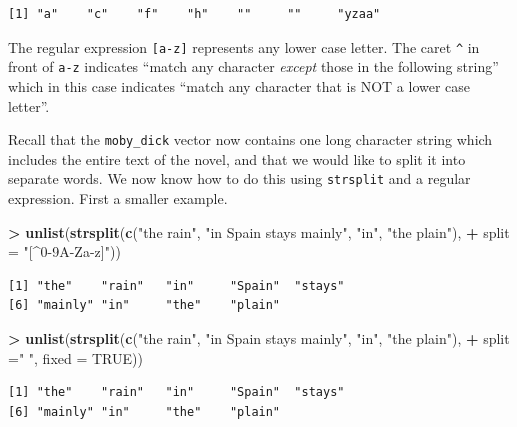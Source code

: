 \documentclass[
]{krantz}
\makeatletter
\newenvironment{Shaded}{\begin{snugshade}}{\end{snugshade}}
\newcommand{\DataTypeTok}[1]{\textcolor[rgb]{0.27,0.27,0.27}{#1}}
\newcommand{\KeywordTok}[1]{\textcolor[rgb]{0.27,0.27,0.27}{\textbf{#1}}}
\newcommand{\NormalTok}[1]{#1}
\newcommand{\OperatorTok}[1]{\textcolor[rgb]{0.43,0.43,0.43}{\textbf{#1}}}
\newcommand{\OtherTok}[1]{\textcolor[rgb]{0.37,0.37,0.37}{#1}}
\newcommand{\StringTok}[1]{\textcolor[rgb]{0.5,0.5,0.5}{#1}}
\newenvironment{kframe}{%
\medskip{}
\setlength{\fboxsep}{.8em}
 \def\at@end@of@kframe{}%
 \ifinner\ifhmode%
  \def\at@end@of@kframe{\end{minipage}}%
  \begin{minipage}{\columnwidth}%
 \fi\fi%
 \def\FrameCommand##1{\hskip\@totalleftmargin \hskip-\fboxsep
 \colorbox{shadecolor}{##1}\hskip-\fboxsep
     \hskip-\linewidth \hskip-\@totalleftmargin \hskip\columnwidth}%
 \MakeFramed {\advance\hsize-\width
   \@totalleftmargin\z@ \linewidth\hsize
   \@setminipage}}%
 {\par\unskip\endMakeFramed%
 \at@end@of@kframe}
\renewenvironment{Shaded}{\begin{kframe}}{\end{kframe}}
\makeatother
\begin{document}
\begin{verbatim}
[1] "a"    "c"    "f"    "h"    ""     ""     "yzaa"
\end{verbatim}

The regular expression \texttt{{[}a-z{]}} represents any lower case letter. The caret \texttt{\^{}} in front of \texttt{a-z} indicates ``match any character \emph{except} those in the following string'' which in this case indicates ``match any character that is NOT a lower case letter''.

Recall that the \texttt{moby\_dick} vector now contains one long character string which includes the entire text of the novel, and that we would like to split it into separate words. We now know how to do this using \texttt{strsplit} and a regular expression. First a smaller example.

\begin{Shaded}
\begin{Highlighting}[]
\OperatorTok{\textgreater{}}\StringTok{ }\KeywordTok{unlist}\NormalTok{(}\KeywordTok{strsplit}\NormalTok{(}\KeywordTok{c}\NormalTok{(}\StringTok{"the rain"}\NormalTok{, }\StringTok{"in Spain stays mainly"}\NormalTok{, }\StringTok{"in"}\NormalTok{, }\StringTok{"the plain"}\NormalTok{), }
\OperatorTok{+}\StringTok{                 }\DataTypeTok{split =} \StringTok{"[\^{}0{-}9A{-}Za{-}z]"}\NormalTok{))}
\end{Highlighting}
\end{Shaded}

\begin{verbatim}
[1] "the"    "rain"   "in"     "Spain"  "stays" 
[6] "mainly" "in"     "the"    "plain" 
\end{verbatim}

\begin{Shaded}
\begin{Highlighting}[]
\OperatorTok{\textgreater{}}\StringTok{ }\KeywordTok{unlist}\NormalTok{(}\KeywordTok{strsplit}\NormalTok{(}\KeywordTok{c}\NormalTok{(}\StringTok{"the rain"}\NormalTok{, }\StringTok{"in Spain stays mainly"}\NormalTok{, }\StringTok{"in"}\NormalTok{, }\StringTok{"the plain"}\NormalTok{), }
\OperatorTok{+}\StringTok{                 }\DataTypeTok{split =}\StringTok{" "}\NormalTok{, }\DataTypeTok{fixed =} \OtherTok{TRUE}\NormalTok{))}
\end{Highlighting}
\end{Shaded}

\begin{verbatim}
[1] "the"    "rain"   "in"     "Spain"  "stays" 
[6] "mainly" "in"     "the"    "plain" 
\end{verbatim}
\end{document}
